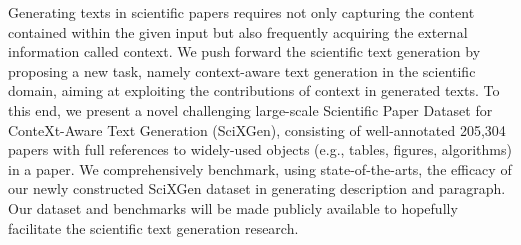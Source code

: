 Generating texts in scientific papers requires not only capturing the content contained within the given input but also frequently acquiring the external information called context. We push forward the scientific text generation by proposing a new task, namely context-aware text generation in the scientific domain, aiming at exploiting the contributions of context in generated texts. To this end, we present a novel challenging large-scale Scientific Paper Dataset for ConteXt-Aware Text Generation (SciXGen), consisting of well-annotated 205,304 papers with full references to widely-used objects (e.g., tables, figures, algorithms) in a paper. We comprehensively benchmark, using state-of-the-arts, the efficacy of our newly constructed SciXGen dataset in generating description and paragraph. Our dataset and benchmarks will be made publicly available to hopefully facilitate the scientific text generation research.
